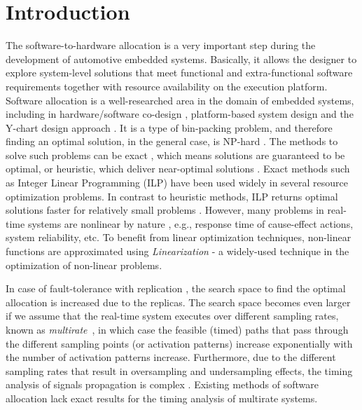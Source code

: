\section{Introduction}
The software-to-hardware allocation is a very important step during the development of automotive embedded systems. Basically, it allows the designer to explore system-level solutions that meet functional and extra-functional software requirements together with resource availability on the execution platform. Software allocation is a well-researched area in the domain of embedded systems, including in hardware/software co-design \cite{Wolf2003ACodesign}, platform-based system design \cite{Sangiovanni-Vincentelli2004BenefitsDesign} and the Y-chart design approach \cite{ychart_Kienhuis2002}. It is a type of bin-packing problem, and therefore finding an optimal solution, in the general case, is  NP-hard \cite{Fernandez-Baca1989AllocatingSystem}. The methods to solve such problems can be exact \cite{Saidi2015AnArchitectures}, which means solutions are guaranteed to be optimal, or heuristic, which deliver near-optimal solutions \cite{faragardi2018AECUs}\cite{Bucaioni2018MoVES:Systems}. Exact methods such as Integer Linear Programming (ILP) \cite{Bradley1977AppliedProgramming} have been used widely in several resource optimization problems. In contrast to heuristic methods, ILP returns optimal solutions faster for relatively small problems \cite{Wozniak2013AnArchitectures}. However, many problems in real-time systems are nonlinear by nature \cite{Fernandez2014SystemApproach}, e.g., response time of cause-effect actions, system reliability, etc. To benefit from linear optimization techniques, non-linear functions are approximated using \textit{Linearization} - a widely-used technique in the optimization of non-linear problems.

In case of fault-tolerance with replication \cite{Kopetz1989DistributedApproach}, the search space to find the optimal allocation is increased due to the replicas. The search space becomes even larger if we assume that the real-time system executes over different sampling rates, known as \textit{multirate}~\cite{Vinet2010APolynomials}, in which case the feasible (timed) paths that pass through the different sampling points (or activation patterns) increase exponentially with the number of activation patterns increase. Furthermore, due to the different sampling rates that result in oversampling and undersampling effects, the timing analysis of signals propagation is complex \cite{mubeen2013support}. Existing methods of software allocation lack exact results for the timing analysis of multirate systems.


